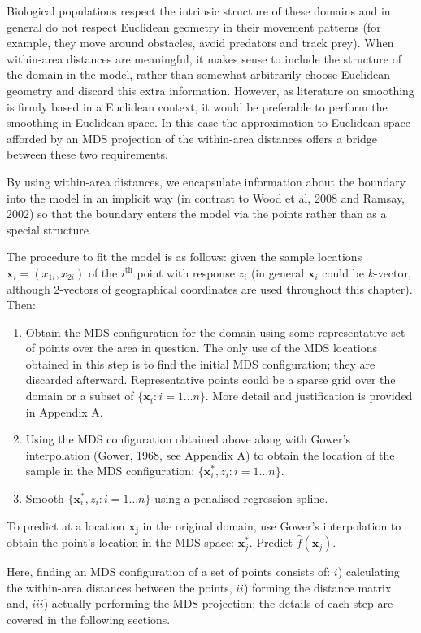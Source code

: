 \documentclass[useAMS,referee, usegraphicx]{biom}
\begin{document}
Biological populations respect the intrinsic structure of these domains and in general do not respect Euclidean geometry in their movement patterns (for example, they move around obstacles, avoid predators and track prey). When within-area distances are meaningful, it makes sense to include the structure of the domain in the model, rather than somewhat arbitrarily choose Euclidean geometry and discard this extra information. However, as literature on smoothing is firmly based in a Euclidean context, it would be preferable to perform the smoothing in Euclidean space. In this case the approximation to Euclidean space afforded by an MDS projection of the within-area distances offers a bridge between these two requirements.

By using within-area distances, we encapsulate information about the boundary into the model in an implicit way (in contrast to Wood et al, 2008 and Ramsay, 2002) so that the boundary enters the model via the points rather than as a special structure.

The procedure to fit the model is as follows: given the sample locations $\mathbf{x}_i = (x_{1i}, x_{2i})$  of the $i^\text{th}$ point with response $z_i$ (in general $\mathbf{x}_i$ could be $k$-vector, although 2-vectors of geographical coordinates are used throughout this chapter). Then:
\begin{enumerate}
\item Obtain the MDS configuration for the domain using some representative set of points over the area in question. The only use of the MDS locations obtained in this step is to find the initial MDS configuration; they are discarded afterward. Representative points could be a sparse grid over the domain or a subset of $\{\mathbf{x}_i : i=1\dots n\}$. More detail and justification is provided in Appendix A.
\item Using the MDS configuration obtained above along with Gower's interpolation (Gower, 1968, see Appendix A) to obtain the location of the sample in the MDS configuration: $\{\mathbf{x}_i^*, z_i : i=1\dots n\}$.
\item Smooth $\{\mathbf{x}_i^*, z_i : i=1\dots n\}$ using a penalised regression spline.
\end{enumerate}
To predict at a location $\mathbf{x_j}$ in the original domain, use Gower's interpolation to obtain the point's location in the MDS space: $\mathbf{x}_j^*$. Predict $\hat{f}(\mathbf{x}_j)$.

Here, finding an MDS configuration of a set of points consists of: $i$) calculating the within-area distances between the points, $ii$) forming the distance matrix and, $iii$) actually performing the MDS projection; the details of each step are covered in the following sections.
\end{document}
